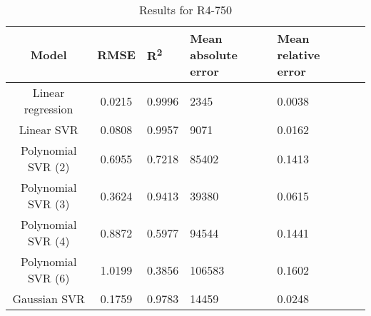 \begin{table}[H]
\centering
\begin{adjustbox}{center}
\begin{tabular}{c | c M{1.2cm} M{2.5cm} M{2.5cm} M{1.8cm}}
Model & RMSE & R\textsuperscript{2} & Mean absolute error & Mean relative error \tabularnewline
\hline
Linear regression & 0.0215 & 0.9996 &   2345 & 0.0038 \\
Linear SVR & 0.0808 & 0.9957 &   9071 & 0.0162 \\
Polynomial SVR (2) & 0.6955 & 0.7218 &  85402 & 0.1413 \\
Polynomial SVR (3) & 0.3624 & 0.9413 &  39380 & 0.0615 \\
Polynomial SVR (4) & 0.8872 & 0.5977 &  94544 & 0.1441 \\
Polynomial SVR (6) & 1.0199 & 0.3856 & 106583 & 0.1602 \\
Gaussian SVR & 0.1759 & 0.9783 &  14459 & 0.0248 \\
\end{tabular}
\end{adjustbox}
\\
\caption{Results for R4-750}
\label{tab:coreonly_linear_R4_750}
\end{table}

